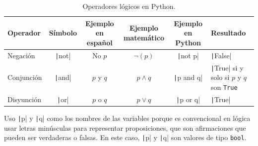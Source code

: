 \begin{table}[h]
\centering
\begin{tabular}{|l|c|c|c|c|}
\hline
\textbf{Operador} & \textbf{Símbolo} & \textbf{Ejemplo en español} & \textbf{Ejemplo matemático} & \textbf{Ejemplo en Python} & \textbf{Resultado} \\
\hline
Negación & \texttt|not| & No $p$ & $\neg (p)$ & \texttt|not p| & \texttt|False| \\
\hline
Conjunción & \texttt|and| & $p$ y $q$ & $p \land q$ & \texttt|p and q| & \texttt|True| si y solo si $p$ y $q$ son \texttt{True}\\
\hline
Disyunción & \texttt|or| & $p$ o $q$ & $p \lor q$ & \texttt|p or q| & \texttt|True| \\
\hline
\end{tabular}
\caption{Operadores lógicos en Python.}
\label{tab:operadores-logicos}
\end{table}

Uso  \texttt|p| y \texttt|q| como los nombres de las variables porque es convencional en lógica usar letras minúsculas para representar proposiciones, que son afirmaciones que pueden ser verdaderas o falsas. En este caso, \texttt|p| y \texttt|q| son valores de tipo \texttt{bool}.

